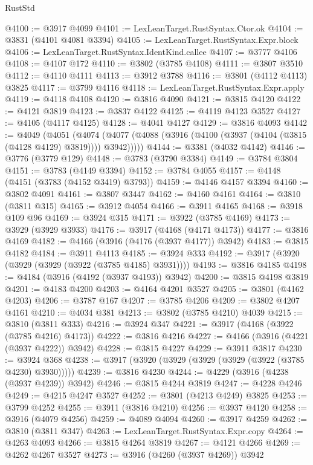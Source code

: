 \begin{lexlean}{RustStd}
\begin{coremodule}
@4100 := @3917 @4099
@4101 := LexLeanTarget.RustSyntax.Ctor.ok
@4104 := @3831 (@4101 @4081 @3394)
@4105 := LexLeanTarget.RustSyntax.Expr.block
@4106 := LexLeanTarget.RustSyntax.IdentKind.callee
@4107 := @3777 @4106
@4108 := @4107 @172
@4110 := @3802 (@3785 @4108)
@4111 := @3807 @3510
@4112 := @4110 @4111
@4113 := @3912 @3788
@4116 := @3801 (@4112 @4113) @3825
@4117 := @3799 @4116
@4118 := LexLeanTarget.RustSyntax.Expr.apply
@4119 := @4118 @4108
@4120 := @3816 @4090
@4121 := @3815 @4120
@4122 := @4121 @3819
@4123 := @3837 @4122
@4125 := @4119 @4123 @3527
@4127 := @4105 (@4117 @4125)
@4128 := @4041 @4127
@4129 := @3816 @4093
@4142 := @4049
    (@4051
      (@4074 (@4077 (@4088 (@3916 (@4100 (@3937 (@4104 (@3815 (@4128 @4129) @3819)))) @3942)))))
@4144 := @3381 (@4032 @4142)
@4146 := @3776 (@3779 @129)
@4148 := @3783 (@3790 @3384)
@4149 := @3784 @3804
@4151 := @3783 (@4149 @3394)
@4152 := @3784 @4055
@4157 := @4148 (@4151 (@3783 (@4152 @3419) @3793))
@4159 := @4146 @4157 @3394
@4160 := @3802 @4091
@4161 := @3807 @3447
@4162 := @4160 @4161
@4164 := @3810 (@3811 @315)
@4165 := @3912 @4054
@4166 := @3911 @4165
@4168 := @3918 @109 @96
@4169 := @3924 @315
@4171 := @3922 (@3785 @4169)
@4173 := @3929 (@3929 @3933)
@4176 := @3917 (@4168 (@4171 @4173))
@4177 := @3816 @4169
@4182 := @4166 (@3916 (@4176 (@3937 @4177)) @3942)
@4183 := @3815 @4182
@4184 := @3911 @4113
@4185 := @3924 @333
@4192 := @3917 (@3920 (@3929 (@3929 (@3922 (@3785 @4185) @3931))))
@4193 := @3816 @4185
@4198 := @4184 (@3916 (@4192 (@3937 @4193)) @3942)
@4200 := @3815 @4198 @3819
@4201 := @4183 @4200
@4203 := @4164 @4201 @3527
@4205 := @3801 (@4162 @4203)
@4206 := @3787 @167
@4207 := @3785 @4206
@4209 := @3802 @4207 @4161
@4210 := @4034 @381
@4213 := @3802 (@3785 @4210) @4039
@4215 := @3810 (@3811 @333)
@4216 := @3924 @347
@4221 := @3917 (@4168 (@3922 (@3785 @4216) @4173))
@4222 := @3816 @4216
@4227 := @4166 (@3916 (@4221 (@3937 @4222)) @3942)
@4228 := @3815 @4227
@4229 := @3911 @3817
@4230 := @3924 @368
@4238 := @3917 (@3920 (@3929 (@3929 (@3929 (@3922 (@3785 @4230) @3930)))))
@4239 := @3816 @4230
@4244 := @4229 (@3916 (@4238 (@3937 @4239)) @3942)
@4246 := @3815 @4244 @3819
@4247 := @4228 @4246
@4249 := @4215 @4247 @3527
@4252 := @3801 (@4213 @4249) @3825
@4253 := @3799 @4252
@4255 := @3911 (@3816 @4210)
@4256 := @3937 @4120
@4258 := @3916 (@4079 @4256)
@4259 := @4089 @4094
@4260 := @3917 @4259
@4262 := @3810 (@3811 @347)
@4263 := LexLeanTarget.RustSyntax.Expr.copy
@4264 := @4263 @4093
@4266 := @3815 @4264 @3819
@4267 := @4121 @4266
@4269 := @4262 @4267 @3527
@4273 := @3916 (@4260 (@3937 @4269)) @3942

\end{coremodule}
\end{lexlean}

